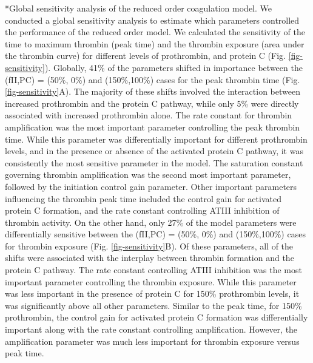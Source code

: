 \documentclass[12pt]{article}
\makeatletter
\renewcommand\subsection{\@startsection
	{subsection}{2}{0mm}
	{-0.05in}
	{-0.5\baselineskip}
	{\normalfont\normalsize\bfseries}}
\makeatother
\begin{document}
\subsection*{Global sensitivity analysis of the reduced order coagulation model.}
We conducted a global sensitivity analysis to estimate which parameters controlled the performance of the reduced order model. 
We calculated the sensitivity of the time to maximum thrombin (peak time) and the thrombin exposure (area under the thrombin curve) 
for different levels of prothrombin, and protein C (Fig. \ref{fig-sensitivity}). 
Globally, 41\% of the parameters shifted in importance between the (fII,PC) = (50\%, 0\%) and (150\%,100\%) cases for the peak thrombin time (Fig. \ref{fig-sensitivity}A). 
The majority of these shifts involved the interaction between increased prothrombin and the protein C pathway, while only
5\% were directly associated with increased prothrombin alone. The rate constant for thrombin amplification was the most important parameter controlling the
peak thrombin time. While this parameter was differentially important for different prothrombin levels, and in the presence or absence of 
the activated protein C pathway, it was consistently the most sensitive parameter in the model. The saturation constant governing thrombin amplification was
the second most important parameter, followed by the initiation control gain parameter. Other important parameters influencing the thrombin peak time included the control gain for
activated protein C formation, and the rate constant controlling ATIII inhibition of thrombin activity. 
On the other hand, only 27\% of the model parameters were differentially sensitive between the (fII,PC) = (50\%, 0\%) and (150\%,100\%) cases 
for thrombin exposure (Fig. \ref{fig-sensitivity}B). Of these parameters, all of the shifts were associated with the interplay between thrombin formation and the protein C pathway. 
The rate constant controlling ATIII inhibition was the most important parameter controlling the thrombin exposure.
While this parameter was less important in the presence of protein C for 150\% prothrombin levels, it was significantly above all other parameters. 
Similar to the peak time, for 150\% prothrombin, the control gain for activated protein C formation was differentially important along with the rate constant controlling
amplification. However, the amplification parameter was much less important for thrombin exposure versus peak time. 

\clearpage
\end{document}
